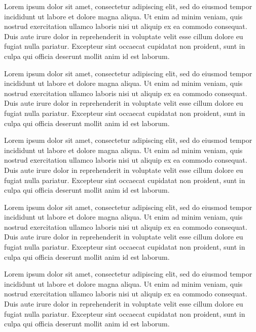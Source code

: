 \documentclass[a4paper,10pt,onecolumn]{article} %
\begin{document}
Lorem ipsum dolor sit amet, \citet{Ribberink85,vanBendegom47,Einstein50,Engelund67,Lane54,deVries71} consectetur adipiscing elit, sed do eiusmod tempor incididunt ut labore et dolore magna aliqua. Ut enim ad minim veniam, quis nostrud exercitation ullamco laboris nisi ut aliquip ex ea commodo consequat. Duis aute irure dolor in reprehenderit in voluptate velit esse cillum dolore eu fugiat nulla pariatur. Excepteur sint occaecat cupidatat non proident, sunt in culpa qui officia deserunt mollit anim id est laborum.


Lorem ipsum dolor sit amet, \citet{Ribberink85,vanBendegom47,Einstein50,Engelund67,Lane54,deVries71} consectetur adipiscing elit, sed do eiusmod tempor incididunt ut labore et dolore magna aliqua. Ut enim ad minim veniam, quis nostrud exercitation ullamco laboris nisi ut aliquip ex ea commodo consequat. Duis aute irure dolor in reprehenderit in voluptate velit esse cillum dolore eu fugiat nulla pariatur. Excepteur sint occaecat cupidatat non proident, sunt in culpa qui officia deserunt mollit anim id est laborum.


Lorem ipsum dolor sit amet, \citet{Ribberink85,vanBendegom47,Einstein50,Engelund67,Lane54,deVries71} consectetur adipiscing elit, sed do eiusmod tempor incididunt ut labore et dolore magna aliqua. Ut enim ad minim veniam, quis nostrud exercitation ullamco laboris nisi ut aliquip ex ea commodo consequat. Duis aute irure dolor in reprehenderit in voluptate velit esse cillum dolore eu fugiat nulla pariatur. Excepteur sint occaecat cupidatat non proident, sunt in culpa qui officia deserunt mollit anim id est laborum.


Lorem ipsum dolor sit amet, \citet{Ribberink85,vanBendegom47,Einstein50,Engelund67,Lane54,deVries71} consectetur adipiscing elit, sed do eiusmod tempor incididunt ut labore et dolore magna aliqua. Ut enim ad minim veniam, quis nostrud exercitation ullamco laboris nisi ut aliquip ex ea commodo consequat. Duis aute irure dolor in reprehenderit in voluptate velit esse cillum dolore eu fugiat nulla pariatur. Excepteur sint occaecat cupidatat non proident, sunt in culpa qui officia deserunt mollit anim id est laborum.


Lorem ipsum dolor sit amet, \citet{Ribberink85,vanBendegom47,Einstein50,Engelund67,Lane54,deVries71} consectetur adipiscing elit, sed do eiusmod tempor incididunt ut labore et dolore magna aliqua. Ut enim ad minim veniam, quis nostrud exercitation ullamco laboris nisi ut aliquip ex ea commodo consequat. Duis aute irure dolor in reprehenderit in voluptate velit esse cillum dolore eu fugiat nulla pariatur. Excepteur sint occaecat cupidatat non proident, sunt in culpa qui officia deserunt mollit anim id est laborum.
\end{document}
